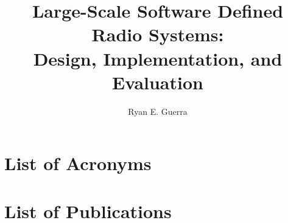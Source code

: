 \documentclass[oneside,12pt]{Ricethesis_PDF}
\author{Ryan E. Guerra}
\title{Large-Scale Software Defined Radio Systems: \protect\\ Design, Implementation, and Evaluation}
\begin{document}


%


\begin{romanpages}





\doublespacing




\setcounter{secnumdepth}{3}
\setcounter{tocdepth}{2}
 
\onehalfspacing
\tableofcontents




\listoffigures
\listoftables

\chapter*{List of Acronyms}



\chapter*{List of Publications}


%



\end{romanpages}
 
\end{document}
